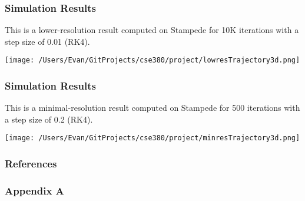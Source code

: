 \documentclass{beamer}
\begin{document}
\begin{frame}
\frametitle{Simulation Results}
This is a lower-resolution result computed on Stampede for 10K iterations with a step size of 0.01 (RK4).

\texttt{[image: /Users/Evan/GitProjects/cse380/project/lowresTrajectory3d.png]}
\end{frame}

\begin{frame}
\frametitle{Simulation Results}
This is a minimal-resolution result computed on Stampede for 500 iterations with a step size of 0.2 (RK4).

\texttt{[image: /Users/Evan/GitProjects/cse380/project/minresTrajectory3d.png]}
\end{frame}

\begin{frame}%
\frametitle{References}


\end{frame}


\appendix
\begin{frame}
\frametitle{Appendix A}

\end{frame}
\end{document}

